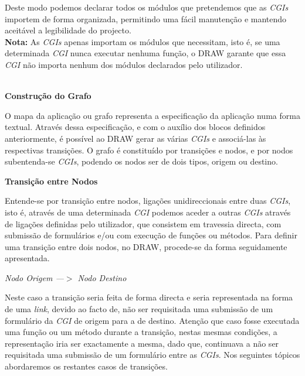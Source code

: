 \documentclass[a4paper]{article}
\begin{document}
Deste modo podemos declarar todos os módulos que pretendemos que as \emph{CGIs} importem de forma organizada, permitindo uma fácil
manutenção e mantendo aceitável a legibilidade do projecto.\\

\textbf{Nota:} As \emph{CGIs} apenas importam os módulos que necessitam, isto é, se uma determinada \emph{CGI} nunca executar nenhuma
função, o DRAW garante que essa \emph{CGI} não importa nenhum dos módulos declarados pelo utilizador.\\\\

\begin{large}
\textbf{Construção do Grafo}\\
\end{large}

\hspace{1cm}O mapa da aplicação ou grafo representa a especificação da aplicação numa forma textual. Através dessa especificação, e com o
auxílio dos blocos definidos anteriormente, é possível ao DRAW gerar as várias \emph{CGIs} e associá-las às respectivas transições.
O grafo é constituído por transições e nodos, e por nodos subentenda-se \emph{CGIs}, podendo os nodos ser de dois tipos, origem ou
destino.\\

\begin{normalsize}
\textbf{Transição entre Nodos}\\
\end{normalsize}

\hspace{1cm}Entende-se por transição entre nodos, ligações unidireccionais entre duas \emph{CGIs}, isto é, através de uma determinada
\emph{CGI} podemos aceder a outras \emph{CGIs} através de ligações definidas pelo utilizador, que consistem em travessia directa, com
submissão de formulários e/ou com execução de funções ou métodos. Para definir uma transição entre dois nodos, no DRAW, procede-se da
forma seguidamente apresentada.

\begin{center}
\emph{Nodo Origem —$>$ Nodo Destino}
\end{center}

Neste caso a transição seria feita de forma directa e seria representada na forma de uma \emph{link}, devido ao facto de, não ser
requisitada uma submissão de um formulário da \emph{CGI} de origem para a de destino. Atenção que caso fosse executada uma função ou
um método durante a transição, nestas mesmas condições, a representação iria ser exactamente a mesma, dado que, continuava a não ser
requisitada uma submissão de um formulário entre as \emph{CGIs}.
Nos seguintes tópicos abordaremos os restantes casos de transições.\\
\end{document}
